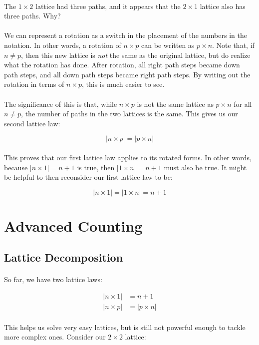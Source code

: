 \documentclass[12pt]{article}
\newcommand{\p}{\paragraph{}}
\begin{document}
			\p The $1\times2$ lattice had three paths, and it appears that the $2\times1$ lattice also has three paths. Why?
			
			\p We can represent a rotation as a switch in the placement of the numbers in the notation. In other words, a rotation of $n \times p$ can be written as $p \times n$. Note that, if $n \neq p$, then this new lattice is \emph{not} the same as the original lattice, but do realize what the rotation has done. After rotation, all right path steps became down path steps, and all down path steps became right path steps. By writing out the rotation in terms of $n \times p$, this is much easier to see.
			
			\p The significance of this is that, while $n \times p$ is not the same lattice as $p \times n$ for all $n \neq p$, the number of paths in the two lattices is the same. This gives us our second lattice law:
			
			\begin{equation*}
				|n \times p| = |p \times n|
			\end{equation*}
			
			\p This proves that our first lattice law applies to its rotated forms. In other words, because $|n \times 1| = n+1$ is true, then $|1 \times n| = n + 1$ must also be true. It might be helpful to then reconsider our first lattice law to be:
			
			\begin{equation*}
				|n \times 1| = |1 \times n| = n + 1
			\end{equation*}
			
	\section{Advanced Counting}
	
		\subsection{Lattice Decomposition}
			
			\p So far, we have two lattice laws:
			
			\begin{align*}
				|n \times 1| &= n + 1 \\
				|n \times p| &= |p \times n|
			\end{align*}
			
			\p This helps us solve very easy lattices, but is still not powerful enough to tackle more complex ones. Consider our $2 \times 2$ lattice:
			
\end{document}

